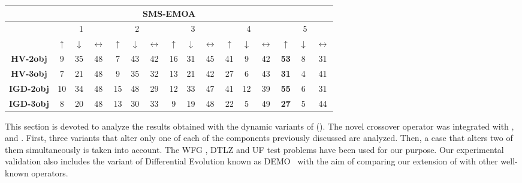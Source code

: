 \begin{table}[t]
\begin{tabular}{|c|c|c|c|c|c|c|c|c|c|c|c|c|c|c|c|}
\hline
\hline
\multicolumn{16}{|c|}{SMS-EMOA} \\ \hline
 & \multicolumn{3}{c|}{1} & \multicolumn{3}{c|}{2} & \multicolumn{3}{c|}{3} & \multicolumn{3}{c|}{4} & \multicolumn{3}{c|}{5} \\ \hline
 & $\uparrow$ & $\downarrow$ & $\longleftrightarrow$ & $\uparrow$ & $\downarrow$ & $\longleftrightarrow$ & $\uparrow$ & $\downarrow$ & $\longleftrightarrow$ & $\uparrow$ & $\downarrow$ & $\longleftrightarrow$ & $\uparrow$ & $\downarrow$ & $\longleftrightarrow$ \\ \hline
\textbf{HV-2obj} & 9 & 35 & 48 & 7 & 43 & 42 & 16 & 31 & 45 & 41 & 9 & 42 & \textbf{53} & 8 & 31 \\ \hline
\textbf{HV-3obj} & 7 & 21 & 48 & 9 & 35 & 32 & 13 & 21 & 42 & 27 & 6 & 43 & \textbf{31} & 4 & 41 \\ \hline
\textbf{IGD-2obj} & 10 & 34 & 48 & 15 & 48 & 29 & 12 & 33 & 47 & 41 & 12 & 39 & \textbf{55} & 6 & 31 \\ \hline
\textbf{IGD-3obj} & 8 & 20 & 48 & 13 & 30 & 33 & 9 & 19 & 48 & 22 & 5 & 49 & \textbf{27} & 5 & 44 \\ \hline
\end{tabular}
\end{table}


This section is devoted to analyze the results obtained with the dynamic variants of \SBX{} (\DSBX{}).
%
The novel crossover operator was integrated with \NSGAII{}, \MOEAD{} and \SMSEMOA{}.
%
First, three variants that alter only one of each of the components previously discussed are analyzed.
%
Then, a case that alters two of them simultaneously is taken into account.
%
The WFG \cite{Joel:WFG}, DTLZ \cite{Joel:DTLZ_2} and UF \cite{zhang2009performance} test problems have been used for our purpose.
%
Our experimental validation also includes the variant of Differential Evolution known as DEMO~\cite{tuvsar2007differential}
with the aim of comparing our extension of \SBX{} with other well-known operators.

